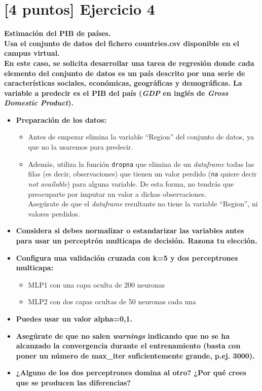 \newpage
{}
\section{[4 puntos] Ejercicio 4}
\textbf{Estimación del PIB de países.} \\

\textbf{Usa el conjunto de datos del fichero countries.csv disponible en el campus virtual.}\\

\textbf{En este caso, se solicita desarrollar una tarea de regresión donde cada elemento del
conjunto de datos es un país descrito por una serie de características sociales,
económicas, geográficas y demográficas. La variable a predecir es el PIB del país
(\textit{GDP} en inglés de \textit{Gross Domestic Product}).}

\begin{itemize}
    \item \textbf{Preparación de los datos:}
    \begin{itemize}
        \item Antes de empezar elimina la variable “Region” del conjunto de datos, ya
que no la usaremos para predecir.
        \item Además, utiliza la función \texttt{dropna} que elimina de un \textit{dataframe}
        todas las
filas (es decir, observaciones) que tienen un valor perdido (\texttt{na} quiere
decir \textit{not available}) para alguna variable. De esta forma, no tendrás que
preocuparte por imputar un valor a dichas observaciones. \\
Asegúrate de que el \textit{dataframe} resultante no tiene la variable ``Region'', ni
valores perdidos.
    \end{itemize}

    \item \textbf{Considera si debes normalizar o estandarizar las variables antes para usar un
perceptrón multicapa de decisión. Razona tu elección.}

    \item \textbf{Configura una validación cruzada con k=5 y dos perceptrones multicapa:}
    \begin{itemize}
        \item MLP1 con una capa oculta de 200 neuronas
        \item MLP2 con dos capas ocultas de 50 neuronas cada una
    \end{itemize}

    \item \textbf{Puedes usar un valor alpha=0,1.}
    \item \textbf{Asegúrate de que no salen \textit{warnings} indicando que no se ha alcanzado la
convergencia durante el entrenamiento (basta con poner un número de
max\_iter suficientemente grande, p.ej. 3000).}
    \item \textbf{¿Alguno de los dos perceptrones domina al otro? ¿Por qué crees que se
producen las diferencias?} \\
\end{itemize}

